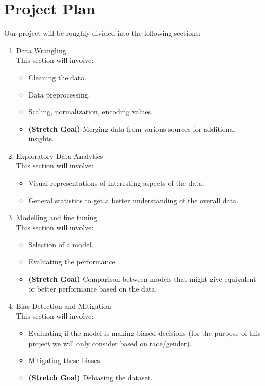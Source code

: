 \documentclass{article}
\begin{document}
\section{Project Plan}
Our project will be roughly divided into the following sections:
\begin{enumerate}
    \item Data Wrangling\\
    This section will involve:
        \begin{itemize}
            \item Cleaning the data.
            \item Data preprocessing.
            \item Scaling, normalization, encoding values.
            \item \textbf{(Stretch Goal)} Merging data from various sources for additional insights.
        \end{itemize}
    \item Exploratory Data Analytics\\
    This section will involve:
        \begin{itemize}
            \item Visual representations of interesting aspects of the data.
            \item General statistics to get a better understanding of the overall data.
        \end{itemize}
    \item Modelling and fine tuning\\
    This section will involve:
        \begin{itemize}
            \item Selection of a model.
            \item Evaluating the performance.
            \item \textbf{(Stretch Goal)} Comparison between models that might give equivalent or better performance based on the data.
        \end{itemize}
    \item Bias Detection and Mitigation\\
    This section will involve:
        \begin{itemize}
            \item Evaluating if the model is making biased decisions (for the purpose of this project we will only consider based on race/gender).
            \item Mitigating these biases.
            \item \textbf{(Stretch Goal)} Debiasing the dataset.\\\\

\end{itemize}
\end{enumerate}
\end{document}
